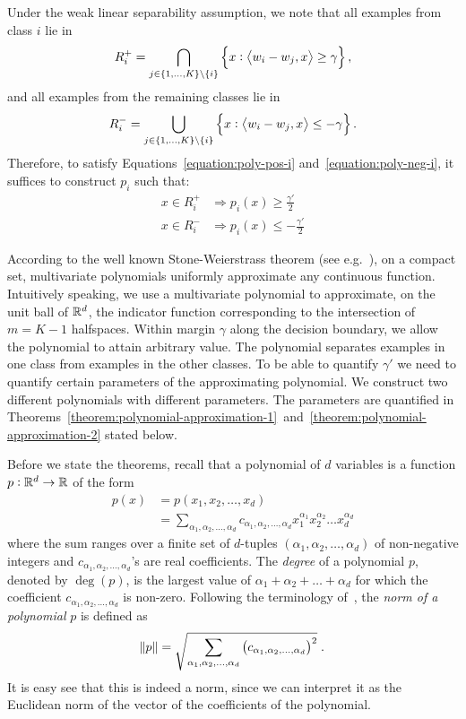 Under the weak linear separability assumption, we note that all examples from
class $i$ lie in
\[ R_i^+ = \bigcap_{j \in \cbr{1,\ldots,K} \setminus \cbr{i}} \cbr{x: \ip{w_i - w_j}{x} \geq \gamma}, \] and all examples from the remaining classes lie in
\[ R_i^- = \bigcup_{j \in \cbr{1,\ldots,K} \setminus \cbr{i}} \cbr{x: \ip{w_i - w_j}{x} \leq  -\gamma}. \]
Therefore, to satisfy Equations~\eqref{equation:poly-pos-i}
and~\eqref{equation:poly-neg-i}, it suffices to construct $p_i$ such that:
\begin{align*}
x \in R_i^+ & \Rightarrow p_i(x) \ge \frac {\gamma'} 2 \\
x \in R_i^- & \Rightarrow p_i(x) \le - \frac {\gamma'} 2
\end{align*}

According to the well known Stone-Weierstrass theorem (see
e.g.~\citet[Section~10.10]{Davidson-Donsig-2010}), on a compact set,
multivariate polynomials uniformly approximate any continuous function.
Intuitively speaking, we use a multivariate polynomial to approximate, on the
unit ball of $\mathbb{R}^d$, the indicator function corresponding to the intersection of
$m=K-1$ halfspaces. Within margin $\gamma$ along the decision boundary, we allow
the polynomial to attain arbitrary value. The polynomial separates examples in
one class from examples in the other classes. To be able to quantify $\gamma'$
we need to quantify certain parameters of the approximating polynomial. We
construct two different polynomials with different parameters. The parameters
are quantified in
Theorems~\ref{theorem:polynomial-approximation-1}~and~\ref{theorem:polynomial-approximation-2}
stated below.

Before we state the theorems, recall that a polynomial of $d$ variables is a
function $p:\mathbb{R}^d \to \mathbb{R}$ of the form
\begin{align*}
p(x)
& = p(x_1, x_2, \dots, x_d) \\
& = \sum_{\alpha_1, \alpha_2, \dots, \alpha_d} c_{\alpha_1, \alpha_2, \dots, \alpha_d} x_1^{\alpha_1} x_2^{\alpha_2} \dots x_d^{\alpha_d}
\end{align*}
where the sum ranges over a finite set of $d$-tuples $(\alpha_1, \alpha_2,
\dots, \alpha_d)$ of non-negative integers and $c_{\alpha_1, \alpha_2, \dots,
\alpha_d}$'s are real coefficients. The \emph{degree} of a polynomial $p$,
denoted by $\deg(p)$, is the largest value of $\alpha_1 + \alpha_2 + \dots +
\alpha_d$ for which the coefficient $c_{\alpha_1, \alpha_2, \dots, \alpha_d}$ is
non-zero. Following the terminology of~\citet{Klivans-Servedio-2008}, the
\emph{norm of a polynomial} $p$ is defined as
$$
\norm{p} = \sqrt{\sum_{\alpha_1, \alpha_2, \dots, \alpha_d} \left(c_{\alpha_1, \alpha_2, \dots, \alpha_d} \right)^2 } \; .
$$
It is easy see that this is indeed a norm, since we can interpret it as the
Euclidean norm of the vector of the coefficients of the polynomial.

